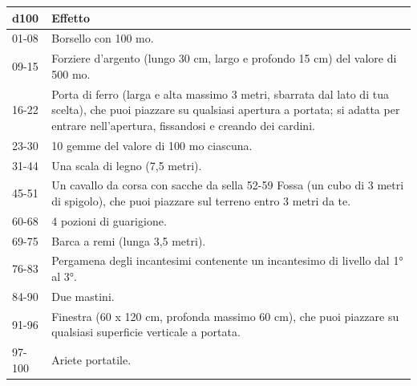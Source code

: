 \medskip
\begin{tabularx}{0.95\textwidth}{lX}
	\textbf{d100} & \textbf{Effetto}\\
	\hline
	01-08 &Borsello con 100 mo.\\
	09-15& Forziere d'argento (lungo 30 cm, largo e profondo 15 cm) del valore di 500 mo.\\
	16-22& Porta di ferro (larga e alta massimo 3 metri, sbarrata dal lato di tua scelta), che puoi piazzare su qualsiasi apertura a portata; si adatta per entrare nell'apertura, fissandosi e creando dei cardini.\\
	23-30 &10 gemme del valore di 100 mo ciascuna.\\
	31-44 &Una scala di legno (7,5 metri).\\
	45-51 &Un cavallo da corsa con sacche da sella 52-59 Fossa (un cubo di 3 metri di spigolo), che puoi piazzare sul terreno entro 3 metri da te.\\
	60-68 &4 pozioni di guarigione. \\
	69-75 &Barca a remi (lunga 3,5 metri).\\
	76-83& Pergamena degli incantesimi contenente un incantesimo di livello dal 1° al 3°.\\
	84-90& Due mastini.\\
	91-96 &Finestra (60 x 120 cm, profonda massimo 60 cm), che puoi piazzare su qualsiasi superficie verticale a portata.\\
	97-100 &Ariete portatile.\\
\end{tabularx}

